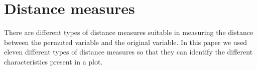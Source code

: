 \documentclass[12]{report}
\begin{document}


\section{Distance measures}\label{defn.distance}

%
%

%

There are different types of distance measures suitable in measuring the distance between the permuted variable and the original variable. In this paper we used eleven different types of distance measures so that they can identify the different characteristics present in a plot. \\
\end{document}
